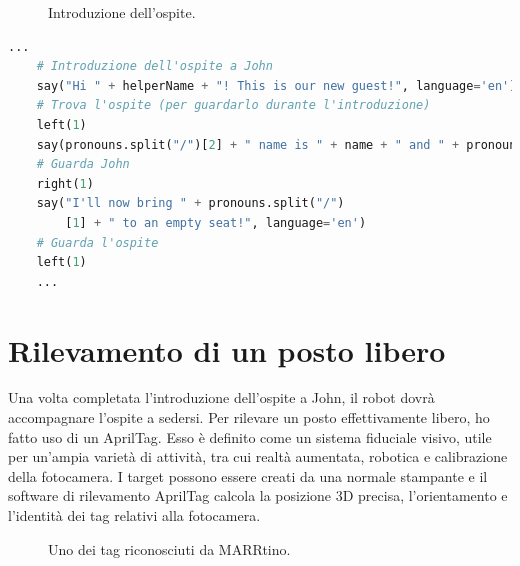 \documentclass[italian, twoside]{sapthesis} %
\begin{document}
\begin{figure}[H]
    \centering
    \caption{Introduzione dell'ospite.}
    \label{fig:introduzione}
\end{figure}

\begin{lstlisting}[language=Python]
    ...
    # Introduzione dell'ospite a John
    say("Hi " + helperName + "! This is our new guest!", language='en')
    # Trova l'ospite (per guardarlo durante l'introduzione)
    left(1)
    say(pronouns.split("/")[2] + " name is " + name + " and " + pronouns.split("/")[2] + " favorite drink is " + drink + ".", language='en')
    # Guarda John
    right(1)
    say("I'll now bring " + pronouns.split("/")
        [1] + " to an empty seat!", language='en')
    # Guarda l'ospite
    left(1)
    ...
\end{lstlisting}

\section{Rilevamento di un posto libero}
Una volta completata l'introduzione dell'ospite a John, il robot dovrà accompagnare l'ospite a sedersi. Per rilevare un posto effettivamente libero, ho fatto uso di un AprilTag. Esso è definito come un sistema fiduciale visivo, utile per un'ampia varietà di attività, tra cui realtà aumentata, robotica e calibrazione della fotocamera. I target possono essere creati da una normale stampante e il software di rilevamento AprilTag calcola la posizione 3D precisa, l'orientamento e l'identità dei tag relativi alla fotocamera.

\begin{figure}[H]
    \centering
    \caption{Uno dei tag riconosciuti da MARRtino.}
    \label{fig:apriltag}
\end{figure}
\end{document}
